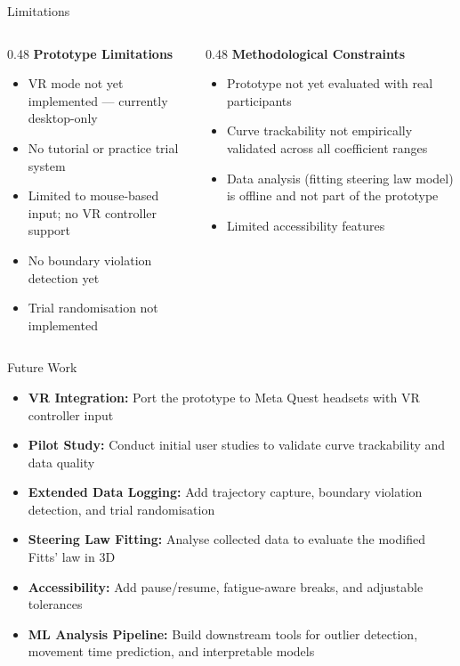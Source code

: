 \documentclass[aspectratio=169, 10pt]{beamer}
\begin{document}
\begin{frame}{Limitations}
  \begin{columns}[T]
    \begin{column}{0.48\textwidth}
      \textbf{Prototype Limitations}
      \begin{itemize}
        \item VR mode not yet implemented --- currently desktop-only
        \item No tutorial or practice trial system
        \item Limited to mouse-based input; no VR controller support
        \item No boundary violation detection yet
        \item Trial randomisation not implemented
      \end{itemize}
    \end{column}
    \begin{column}{0.48\textwidth}
      \textbf{Methodological Constraints}
      \begin{itemize}
        \item Prototype not yet evaluated with real participants
        \item Curve trackability not empirically validated across all coefficient ranges
        \item Data analysis (fitting steering law model) is offline and not part of the prototype
        \item Limited accessibility features
      \end{itemize}
    \end{column}
  \end{columns}
\end{frame}

\begin{frame}{Future Work}
  \begin{itemize}
    \item \textbf{VR Integration:} Port the prototype to Meta Quest headsets with VR controller input
    \item \textbf{Pilot Study:} Conduct initial user studies to validate curve trackability and data quality
    \item \textbf{Extended Data Logging:} Add trajectory capture, boundary violation detection, and trial randomisation
    \item \textbf{Steering Law Fitting:} Analyse collected data to evaluate the modified Fitts' law in 3D
    \item \textbf{Accessibility:} Add pause/resume, fatigue-aware breaks, and adjustable tolerances
    \item \textbf{ML Analysis Pipeline:} Build downstream tools for outlier detection, movement time prediction, and interpretable models
  \end{itemize}
\end{frame}
\end{document}
